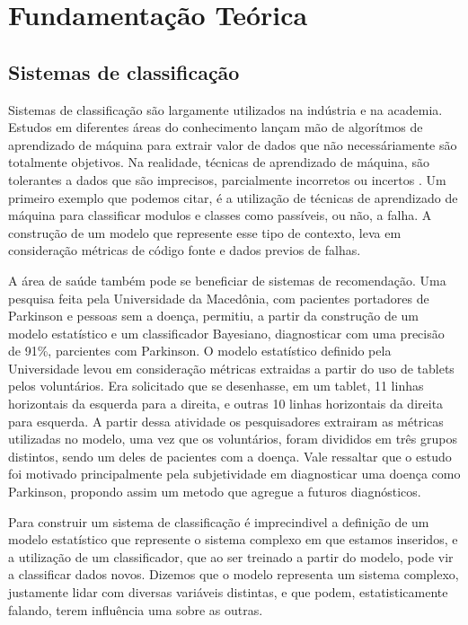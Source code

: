 \part{Fundamentação Teórica}

\chapter{Sistemas de classificação}
Sistemas de classificação são largamente utilizados na indústria e na academia. Estudos em diferentes áreas do conhecimento
lançam mão de algorítmos de aprendizado de máquina para extrair valor de dados que não necessáriamente são totalmente objetivos. Na realidade,
técnicas de aprendizado de máquina, são tolerantes a dados que são imprecisos, parcialmente incorretos ou incertos \cite{Malhotra}. Um primeiro 
exemplo que podemos citar, é a utilização de técnicas de aprendizado de máquina para classificar modulos e classes como passíveis, ou não, a falha\cite{Malhotra}.  A construção de um modelo que represente esse tipo de contexto, leva em consideração métricas de código fonte e dados previos de falhas\cite{Malhotra}. 

A área de saúde também pode se beneficiar de sistemas de recomendação. Uma pesquisa feita pela Universidade da Macedônia,  com pacientes portadores de Parkinson e pessoas sem a doença, permitiu, a partir da construção de um modelo estatístico e um classificador Bayesiano, diagnosticar com uma precisão de 91\%, parcientes com Parkinson\cite{Kotsavasiloglou}. O modelo estatístico definido pela Universidade levou em consideração métricas extraidas a partir do uso de tablets pelos voluntários. Era solicitado que se desenhasse, em um tablet, 11 linhas horizontais da esquerda para a direita, e outras 10 linhas horizontais da direita para esquerda. A partir dessa atividade os pesquisadores extrairam as métricas utilizadas no modelo, uma vez que os voluntários, foram divididos em três grupos distintos, sendo um deles de pacientes com a doença. Vale ressaltar que o estudo foi motivado principalmente pela subjetividade em diagnosticar uma doença como Parkinson, propondo assim um metodo que agregue a futuros diagnósticos.


Para construir um sistema de classificação é imprecindivel a definição de um modelo estatístico que represente o sistema complexo em que estamos inseridos, e a utilização de um classificador, que ao ser treinado a partir do modelo, pode vir a classificar dados novos. Dizemos que o modelo representa um sistema complexo, justamente lidar com diversas variáveis distintas, e que podem, estatisticamente falando, terem influência uma sobre as outras.


